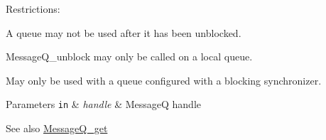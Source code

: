 Restrictions:
\begin{DoxyItemize}
\item A queue may not be used after it has been unblocked.
\item MessageQ\_\-unblock may only be called on a local queue.
\item May only be used with a queue configured with a blocking synchronizer.
\end{DoxyItemize}


\begin{DoxyParams}[1]{Parameters}
\mbox{\tt in}  & {\em handle} & MessageQ handle\\
\hline
\end{DoxyParams}
\begin{DoxySeeAlso}{See also}
\hyperlink{_message_q_8h_aaeb270f6b50d96f1e1dd134591ffc380}{MessageQ\_\-get} 
\end{DoxySeeAlso}
